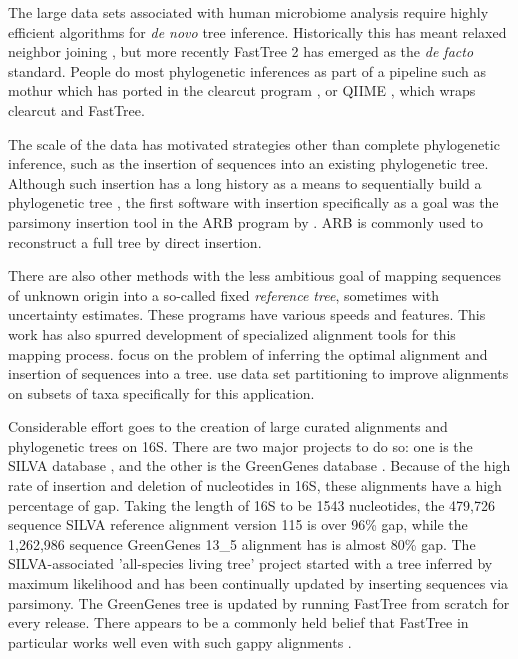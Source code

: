 \documentclass{amsart}
\begin{document}
The large data sets associated with human microbiome analysis require highly efficient algorithms for \emph{de novo} tree inference.
Historically this has meant relaxed neighbor joining \citep{evans2006relaxed}, but more recently FastTree 2 \citep{price2010fasttree} has emerged as the \textit{de facto} standard.
People do most phylogenetic inferences as part of a pipeline such as mothur \citep{schloss2009introducing} which has ported in the clearcut program \citep{sheneman2006clearcut}, or QIIME \citep{caporaso2010qiime}, which wraps clearcut and FastTree.

The scale of the data has motivated strategies other than complete phylogenetic inference, such as the insertion of sequences into an existing phylogenetic tree.
Although such insertion has a long history as a means to sequentially build a phylogenetic tree \citep{kluge1969quantitative}, the first software with insertion specifically as a goal was the parsimony insertion tool in the ARB program by \citet{ludwig2004arb}.
ARB is commonly used to reconstruct a full tree by direct insertion.

There are also other methods with the less ambitious goal of mapping sequences of unknown origin into a so-called fixed \textit{reference tree}, sometimes with uncertainty estimates.
These programs \citep{wu2008simple,monierEaLargeViruses08,vonMeringEaQuantitative08,stark2010mltreemap,matsen2010pplacer,berger2011performance} have various speeds and features.
This work has also spurred development of specialized alignment tools for this mapping process.
\citet{berger2011aligning} focus on the problem of inferring the optimal alignment and insertion of sequences into a tree.
\citet{mirarabsepp} use data set partitioning to improve alignments on subsets of taxa specifically for this application.

Considerable effort goes to the creation of large curated alignments and phylogenetic trees on 16S.
There are two major projects to do so: one is the SILVA database \citep{pruesse2007silva,quast2013silva}, and the other is the GreenGenes database \citep{desantis2006greengenes,mcdonald2011improved}.
Because of the high rate of insertion and deletion of nucleotides in 16S, these alignments have a high percentage of gap.
Taking the length of 16S to be 1543 nucleotides,
the 479,726 sequence SILVA reference alignment version 115 is over 96\% gap,
while the 1,262,986 sequence GreenGenes 13\_5 alignment has is almost 80\% gap.
The SILVA-associated 'all-species living tree' project \citep{yarza2008all} started with a tree inferred by maximum likelihood and has been continually updated  by inserting sequences via parsimony.
The GreenGenes tree is updated by running FastTree from scratch for every release.
There appears to be a commonly held belief that FastTree in particular works well even with such gappy alignments \citep[e.g.][]{sharpton2011phylotu}.
\end{document}
